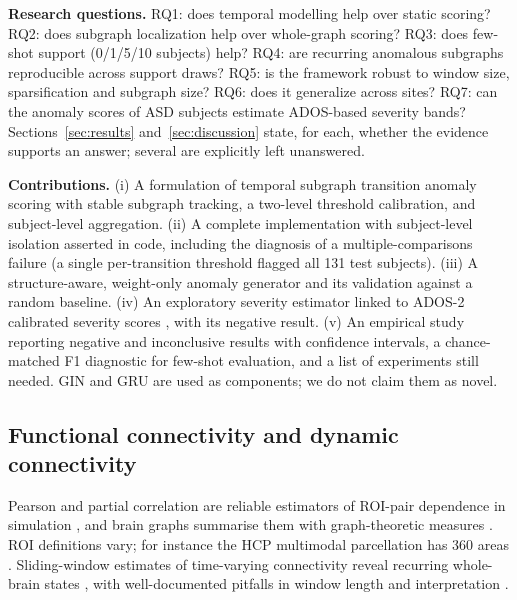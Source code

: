 \documentclass[conference]{IEEEtran}
\makeatletter
\renewcommand\section{\@startsection{section}{1}{\z@}{1.5ex plus 1.5ex minus 0.5ex}{0.7ex}{\normalfont\centering\bfseries}}
\makeatother
\begin{document}
\textbf{Research questions.} RQ1: does temporal modelling help over static scoring? RQ2: does subgraph localization help over whole-graph scoring? RQ3: does few-shot support (0/1/5/10 subjects) help? RQ4: are recurring anomalous subgraphs reproducible across support draws? RQ5: is the framework robust to window size, sparsification and subgraph size? RQ6: does it generalize across sites? RQ7: can the anomaly scores of ASD subjects estimate ADOS-based severity bands? Sections~\ref{sec:results} and~\ref{sec:discussion} state, for each, whether the evidence supports an answer; several are explicitly left unanswered.

\textbf{Contributions.} (i) A formulation of temporal subgraph transition anomaly scoring with stable subgraph tracking, a two-level threshold calibration, and subject-level aggregation. (ii) A complete implementation with subject-level isolation asserted in code, including the diagnosis of a multiple-comparisons failure (a single per-transition threshold flagged all 131 test subjects). (iii) A structure-aware, weight-only anomaly generator and its validation against a random baseline. (iv) An exploratory severity estimator linked to ADOS-2 calibrated severity scores \cite{gotham2009}, with its negative result. (v) An empirical study reporting negative and inconclusive results with confidence intervals, a chance-matched F1 diagnostic for few-shot evaluation, and a list of experiments still needed. GIN \cite{xu2019gin} and GRU \cite{cho2014} are used as components; we do not claim them as novel.

\section{LITERATURE REVIEW}
\subsection{Functional connectivity and dynamic connectivity}
Pearson and partial correlation are reliable estimators of ROI-pair dependence in simulation \cite{smith2011}, and brain graphs summarise them with graph-theoretic measures \cite{bullmore2009}. ROI definitions vary; for instance the HCP multimodal parcellation has 360 areas \cite{glasser2016}. Sliding-window estimates of time-varying connectivity reveal recurring whole-brain states \cite{allen2014}, with well-documented pitfalls in window length and interpretation \cite{hutchison2013,preti2017}.
\end{document}

